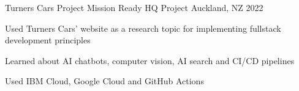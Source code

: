 \begin{cventries}
\cventry
{Turners Cars Project} %
{Mission Ready HQ Project} %
{Auckland, NZ} %
{2022} %
{
  \begin{cvitems} %
    \item {Used Turners Cars' website as a research topic for implementing fullstack development principles}
    \item {Learned about AI chatbots, computer vision, AI search and CI/CD pipelines}
    \item {Used IBM Cloud, Google Cloud and GitHub Actions}
  \end{cvitems}
}


\end{cventries}
